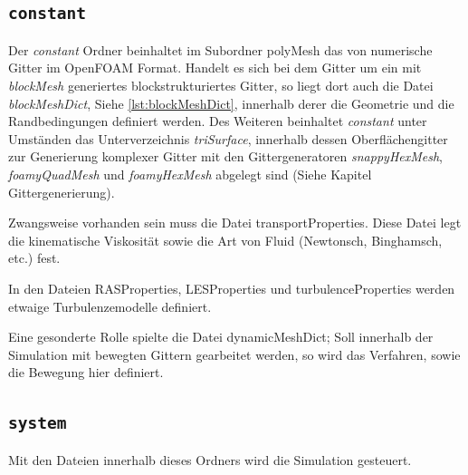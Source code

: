 \subsection{\texttt{constant}}
Der \textit{constant} Ordner beinhaltet im Subordner polyMesh das von numerische Gitter im OpenFOAM Format. Handelt es sich bei dem Gitter um ein mit \textit{blockMesh} generiertes blockstrukturiertes Gitter, so liegt dort auch die Datei \textit{blockMeshDict}, Siehe \autoref{lst:blockMeshDict}, innerhalb derer die Geometrie und die Randbedingungen definiert werden. Des Weiteren beinhaltet \textit{constant} unter Umständen das Unterverzeichnis \textit{triSurface}, innerhalb dessen Oberflächengitter zur Generierung komplexer Gitter mit den Gittergeneratoren \textit{snappyHexMesh}, \textit{foamyQuadMesh} und \textit{foamyHexMesh} abgelegt sind (Siehe Kapitel Gittergenerierung).

Zwangsweise vorhanden sein muss die Datei transportProperties. Diese Datei legt die kinematische Viskosität sowie die Art von Fluid (Newtonsch, Binghamsch, etc.) fest.

In den Dateien RASProperties, LESProperties und turbulenceProperties werden etwaige Turbulenzemodelle definiert. 

Eine gesonderte Rolle spielte die Datei dynamicMeshDict; Soll innerhalb der Simulation mit bewegten Gittern gearbeitet werden, so wird das Verfahren, sowie die Bewegung hier definiert.

\subsection{\texttt{system}}
Mit den Dateien innerhalb dieses Ordners wird die Simulation gesteuert.

